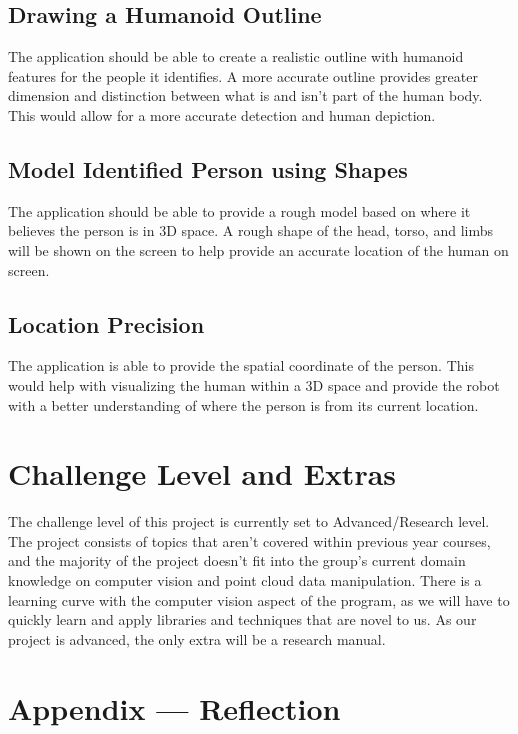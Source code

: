 \documentclass{article}
\begin{document}
\subsection{Drawing a Humanoid Outline}
The application should be able to create a realistic outline with humanoid features for the people it identifies. A more accurate outline provides greater dimension and distinction between what is and isn’t part of the human body. This would allow for a more accurate detection and human depiction.
  
\subsection{Model Identified Person using Shapes}
The application should be able to provide a rough model based on where it believes the person is in 3D space. A rough shape of the head, torso, and limbs will be shown on the screen to help provide an accurate location of the human on screen.

\subsection{Location Precision}
The application is able to provide the spatial coordinate of the person. This would help with visualizing the human within a 3D space and provide the robot with a better understanding of where the person is from its current location.

\section{Challenge Level and Extras}

The challenge level of this project is currently set to Advanced/Research level. The project consists of topics 
that aren't covered within previous year courses, and the majority of the project doesn't fit into the group's current domain knowledge on computer vision and point cloud data manipulation. 
There is a learning curve with the computer vision aspect of the program, as we will have to quickly learn and apply libraries and techniques that are novel to us. As our project is advanced, the only extra will be a research manual.


\newpage{}

\section*{Appendix --- Reflection}

   
\end{document}
